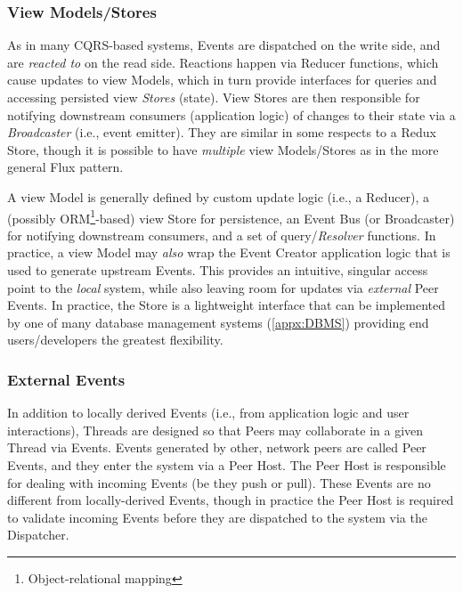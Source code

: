 \documentclass{textile}
\begin{document}

\subsubsection{View Models/Stores}\label{sec:views}

As in many CQRS-based systems, Events are dispatched on the write side, and are \emph{reacted to} on the read side. Reactions happen via Reducer functions, which cause updates to view Models, which in turn provide interfaces for queries and accessing persisted view \emph{Stores} (state). View Stores are then responsible for notifying downstream consumers (application logic) of changes to their state via a \emph{Broadcaster} (i.e., event emitter). They are similar in some respects to a Redux Store, though it is possible to have \emph{multiple} view Models/Stores as in the more general Flux pattern.

A view Model is generally defined by custom update logic (i.e., a Reducer), a (possibly ORM\footnote{Object-relational mapping}-based) view Store for persistence, an Event Bus (or Broadcaster) for notifying downstream consumers, and a set of query/\emph{Resolver} \cite{ereminReduxInspiredBackend2019} functions. In practice, a view Model may \emph{also} wrap the Event Creator application logic that is used to generate upstream Events. This provides an intuitive, singular access point to the \emph{local} system, while also leaving room for updates via \emph{external} Peer Events. In practice, the Store is a lightweight interface that can be implemented by one of many database management systems (\ref{appx:DBMS}) providing end users/developers the greatest flexibility.

\subsubsection{External Events}\label{sec:external}

In addition to locally derived Events (i.e., from application logic and user interactions), Threads are designed so that Peers may collaborate in a given Thread via Events. Events generated by other, network peers are called Peer Events, and they enter the system via a Peer Host. The Peer Host is responsible for dealing with incoming Events (be they push or pull). These Events are no different from locally-derived Events, though in practice the Peer Host is required to validate incoming Events before they are dispatched to the system via the Dispatcher.
\end{document}
